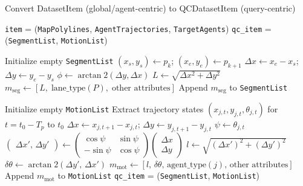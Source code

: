 \begin{algorithm}[h!]
\caption{Convert DatasetItem (global/agent-centric) to QCDatasetItem (query-centric)}
\label{alg:qc_conversion}
\begin{algorithmic}[1]
\REQUIRE \texttt{item} = (\texttt{MapPolylines}, \texttt{AgentTrajectories}, \texttt{TargetAgents})
\ENSURE \texttt{qc\_item} = (\texttt{SegmentList}, \texttt{MotionList})

\STATE Initialize empty \texttt{SegmentList}
        \STATE $(x_s, y_s) \gets p_k$; $(x_e, y_e) \gets p_{k+1}$
        \STATE $\Delta x \gets x_e - x_s$; $\Delta y \gets y_e - y_s$
        \STATE $\phi \gets \arctan2(\Delta y, \Delta x)$
        \STATE $L \gets \sqrt{\Delta x^2 + \Delta y^2}$
        \STATE $m_{\text{seg}} \gets [L,\; \text{lane\_type}(P),\; \text{other attributes}]$
        \STATE Append $m_{\text{seg}}$ to \texttt{SegmentList}
    \ENDFOR
\ENDFOR

\STATE Initialize empty \texttt{MotionList}
    \STATE Extract trajectory states $(x_{j,t}, y_{j,t}, \theta_{j,t})$ for $t = t_0 - T_p$ to $t_0$
        \STATE $\Delta x \gets x_{j,t+1} - x_{j,t}$; $\Delta y \gets y_{j,t+1} - y_{j,t}$
        \STATE $\psi \gets \theta_{j,t}$
        \STATE $\begin{pmatrix}\Delta x',\, \Delta y'\end{pmatrix} \gets
        \begin{pmatrix}
            \cos\psi & \sin\psi \\
            -\sin\psi & \cos\psi
        \end{pmatrix}
        \begin{pmatrix}
            \Delta x \\ \Delta y
        \end{pmatrix}$
        \STATE $l \gets \sqrt{(\Delta x')^2 + (\Delta y')^2}$
        \STATE $\delta\theta \gets \arctan2(\Delta y',\, \Delta x')$
        \STATE $m_{\text{mot}} \gets [l,\, \delta\theta,\, \text{agent\_type}(j),\, \text{other attributes}]$
        \STATE Append $m_{\text{mot}}$ to \texttt{MotionList}
    \ENDFOR
\ENDFOR
\RETURN \texttt{qc\_item} = (\texttt{SegmentList}, \texttt{MotionList})
\end{algorithmic}
\end{algorithm}

